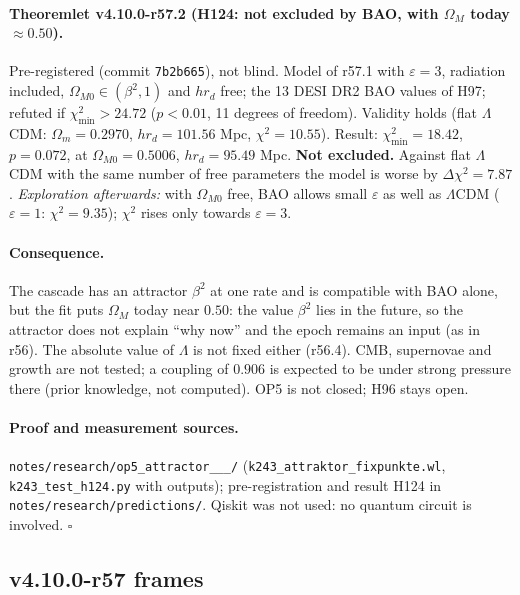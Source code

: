 \paragraph{Theoremlet v4.10.0-r57.2 (H124: not excluded by BAO, with \(\Omega_M\) today \(\approx0.50\)).}
Pre-registered (commit \texttt{7b2b665}), not blind.  Model of r57.1 with \(\varepsilon=3\), radiation included, \(\Omega_{M0}\in(\beta^2,1)\) and \(hr_d\) free; the 13 DESI DR2
BAO values of H97; refuted if \(\chi^2_{\min}>24.72\) (\(p<0.01\), 11 degrees of freedom).  Validity holds (flat \(\Lambda\)CDM: \(\Omega_m=0.2970\), \(hr_d=101.56\) Mpc,
\(\chi^2=10.55\)).  Result: \(\chi^2_{\min}=18.42\), \(p=0.072\), at \(\Omega_{M0}=0.5006\), \(hr_d=95.49\) Mpc.  \textbf{Not excluded.}  Against flat \(\Lambda\)CDM with the same
number of free parameters the model is worse by \(\Delta\chi^2=7.87\).  \emph{Exploration afterwards:} with \(\Omega_{M0}\) free, BAO allows small \(\varepsilon\) as well as
\(\Lambda\)CDM (\(\varepsilon=1\): \(\chi^2=9.35\)); \(\chi^2\) rises only towards \(\varepsilon=3\).

\paragraph{Consequence.}
The cascade has an attractor \(\beta^2\) at one rate and is compatible with BAO alone, but the fit puts \(\Omega_M\) today near \(0.50\): the value \(\beta^2\) lies in the
future, so the attractor does not explain ``why now'' and the epoch remains an input (as in r56).  The absolute value of \(\Lambda\) is not fixed either
(r56.4).  CMB, supernovae and growth are not tested; a coupling of \(0.906\) is expected to be under strong pressure there (prior knowledge, not
computed).  OP5 is not closed; H96 stays open.

\paragraph{Proof and measurement sources.}
\texttt{notes/\allowbreak research/\allowbreak op5\_\allowbreak attractor\_\_\_/} (\texttt{k243\_\allowbreak attraktor\_\allowbreak fixpunkte.wl},
\texttt{k243\_\allowbreak test\_\allowbreak h124.py} with outputs); pre-registration and result H124 in \texttt{notes/\allowbreak research/\allowbreak predictions/}.  Qiskit was not used:
no quantum circuit is involved.  \(\square\)

\subsection*{v4.10.0-r57 frames}
\label{subsec:v4100-r57-frames}

